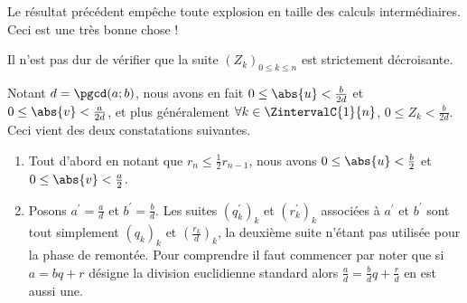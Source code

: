 \begin{remark}
	Le résultat précédent empêche toute explosion en taille des calculs intermédiaires. Ceci est une très bonne chose !
\end{remark}

\begin{remark}
	Il n'est pas dur de vérifier que la suite $(Z_k)_{0 \leq k \leq n}$ est strictement décroisante.
\end{remark}


\begin{remark}
	Notant $d = \pgcd(a ; b)$, nous avons en fait $0 \leq \abs{u} < \frac{b}{2d}$ et $0 \leq \abs{v} < \frac{a}{2d}$, et plus généralement  $\forall k \in \ZintervalC{1}{n}$, $0 \leq Z_k < \frac{b}{2d}$.
	Ceci vient des deux constatations suivantes.
	
	\begin{enumerate}
		\item Tout d'abord en notant que $r_n \leq \frac{1}{2} r_{n-1}$, nous avons $0 \leq \abs{u} < \frac{b}{2}$ et $0 \leq \abs{v} < \frac{a}{2}$.


		\item Posons $a^\prime = \frac{a}{d}$ et $b^\prime = \frac{b}{d}$.
		Les suites $(q^\prime_k)_k$ et $(r^\prime_k)_k$ associées à $a^\prime$ et $b^\prime$ sont tout simplement $(q_k)_k$ et $\left( \frac{r_k}{d} \right)_k$, la deuxième suite n'étant pas utilisée pour la phase de remontée.
		Pour comprendre il faut commencer par noter que si $a = bq + r$ désigne la division euclidienne standard alors $\frac{a}{d} = \frac{b}{d}q + \frac{r}{d}$ en est aussi une.
	\end{enumerate}
\end{remark}

